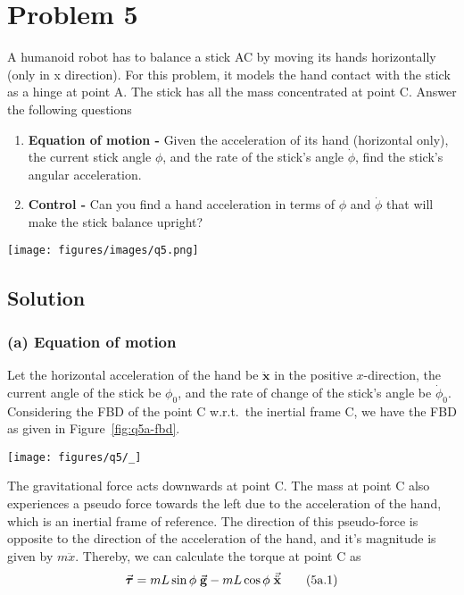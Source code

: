 \section*{Problem 5}

A humanoid robot has to balance a stick AC by moving its hands horizontally (only in x direction).
For this problem, it models the hand contact with the stick as a hinge at point A.
The stick has all the mass concentrated at point C.
Answer the following questions

\begin{enumerate}[label = (\alph*)]
    \item \textbf{Equation of motion -} Given the acceleration of its hand (horizontal only), the current stick angle \( \phi \), and the rate of the stick's angle \( \dot\phi \), find the stick's angular acceleration.
    \item \textbf{Control -} Can you find a hand acceleration in terms of \( \phi \) and \( \dot\phi \) that will make the stick balance upright?
\end{enumerate}

\begin{figure*}[h]
    \centering
    \texttt{[image: figures/images/q5.png]}
\end{figure*}

\subsection*{Solution}

\subsubsection*{(a) Equation of motion}

Let the horizontal acceleration of the hand be \( \mathbf{\ddot x} \) in the positive \(x\)-direction, the current angle of the stick be \( \phi_0 \), and the rate of change of the stick's angle be \( \dot\phi_0 \).
Considering the FBD of the point C w.r.t.\ the inertial frame C, we have the FBD as given in Figure~\ref{fig:q5a-fbd}.

\begin{figure*}[htb]
    \centering
    \texttt{[image: figures/q5/\_]}
    \caption{
        Free body diagram of the stick.
    }\label{fig:q5a-fbd}
\end{figure*}

The gravitational force acts downwards at point C.
The mass at point C also experiences a pseudo force towards the left due to the acceleration of the hand, which is an inertial frame of reference.
The direction of this pseudo-force is opposite to the direction of the acceleration of the hand, and it's magnitude is given by \( m\ddot x \).
Thereby, we can calculate the torque at point C as
\begin{equation}
    \vec{\boldsymbol{\tau}} = mL\sin\phi \; \vec{\mathbf{g}} - mL\cos\phi \; \vec{\ddot{\mathbf{x}}} \\
    \tag{5a.1}
\end{equation}

